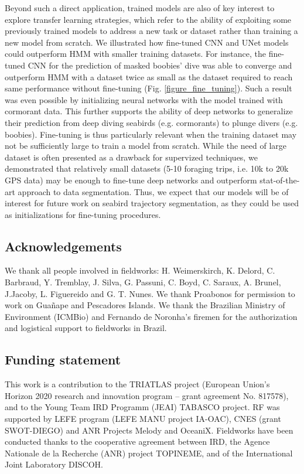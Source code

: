 \documentclass{article}
\begin{document}
Beyond such a direct application, trained models are also of key interest to explore transfer learning strategies, which refer to the ability of exploiting some previously trained models to address a new task or dataset rather than training a new model from scratch. We illustrated how fine-tuned CNN and UNet models could outperform HMM with smaller training datasets. For instance, the fine-tuned CNN for the prediction of masked boobies' dive was able to converge and outperform HMM with a dataset twice as small as the dataset required to reach same performance without fine-tuning (Fig. \ref{figure_fine_tuning}). Such a result was even possible by initializing neural networks with the model trained with cormorant data. This further supports the ability of deep networks to generalize their prediction from deep diving seabirds (e.g. cormorants) to plunge divers (e.g. boobies). Fine-tuning is thus particularly relevant when the training dataset may not be sufficiently large to train a model from scratch. While the need of large dataset is often presented as a drawback for supervized techniques, we demonstrated that relatively small datasets (5-10 foraging trips, i.e. 10k to 20k GPS data) may be enough to fine-tune deep networks and outperform stat-of-the-art approach to data segmentation. Thus, we expect that our models will be of interest for future work on seabird trajectory segmentation, as they could be used as initializations for fine-tuning procedures.

\subsection*{Acknowledgements}
We thank all people involved in fieldworks: H. Weimerskirch, K. Delord, C. Barbraud, Y. Tremblay, J. Silva, G. Passuni, C. Boyd, C. Saraux, A. Brunel, J.Jacoby, L. Figuereido and G. T. Nunes. We thank Proabonos for permission to work on Guañape and Pescadores Islands. We thank the Brazilian Ministry of Environment (ICMBio) and Fernando de Noronha's firemen for the authorization and logistical support to fieldworks in Brazil.

\subsection*{Funding statement}
This work is a contribution to the TRIATLAS project (European Union's Horizon 2020 research and innovation program – grant agreement No. 817578), and to the Young Team IRD Programm (JEAI)  TABASCO project. RF was supported by LEFE program (LEFE MANU project IA-OAC), CNES (grant SWOT-DIEGO) and ANR Projects Melody and OceaniX. Fieldworks have been conducted thanks to the cooperative agreement between IRD, the Agence Nationale de la Recherche (ANR) project TOPINEME, and of the International Joint Laboratory DISCOH.
\end{document}
